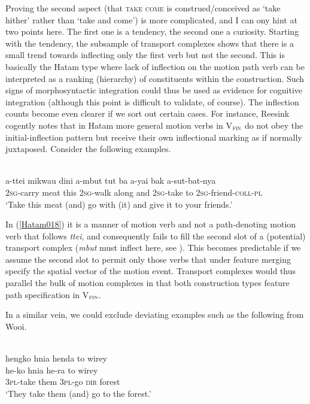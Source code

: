 Proving the second aspect (that \textsc{take} \textsc{come} is construed/conceived as `take hither' rather than `take and come') is more complicated, and I can ony hint at two points here. The first one is a tendency, the second one a curiosity. Starting with the tendency, the subsample of transport complexes shows that there is a small trend towards inflecting only the first verb but not the second. This is basically the Hatam type where lack of inflection on the motion path verb can be interpreted as a ranking (hierarchy) of constituents within the construction. Such signs of morphosyntactic integration could thus be used as evidence for cognitive integration (although this point is difficult to validate, of course). The inflection counts become even clearer if we sort out certain cases. For instance, Reesink cogently notes that in Hatam more general motion verbs in V$_{\textsc{fin}}$ do not obey the initial-inflection pattern but receive their own inflectional marking as if normally juxtaposed. Consider the following examples.

\ea \label{Hatam018}
\\
\gll a-ttei mikwau dini a-mbut tut ba a-yai bak a-sut-bat-nya \\
\textsc{2}\textsc{sg}-carry meat this \textsc{2}\textsc{sg}-walk along and \textsc{2}\textsc{sg}-take to \textsc{2}\textsc{sg}-friend-\textsc{coll}-\textsc{pl} \\
\glft `Take this meat (and) go with (it) and give it to your friends.'\\ 
\z

In (\ref{Hatam018}) it is a manner of motion verb and not a path-denoting motion verb that follows \textit{ttei}, and consequently fails to fill the second slot of a (potential) transport complex (\textit{mbut} must inflect here, see \citealt[100]{reesink1999grammar}). This becomes predictable if we assume the second slot to permit only those verbs that under feature merging specify the spatial vector of the motion event. Transport complexes would thus parallel the bulk of motion complexes in that both construction types feature path specification in V$_{\textsc{fin}}$. 

In a similar vein, we could exclude deviating examples such as the following from Wooi.

\ea \label{Wooi137}
\\
\glll hengko hnia henda to wirey \\
he-ko hnia he-ra to wirey \\
\textsc{3}\textsc{pl}-take them \textsc{3}\textsc{pl}-go \textsc{dir} forest \\
\glft `They take them (and) go to the forest.'\\ 
\z

